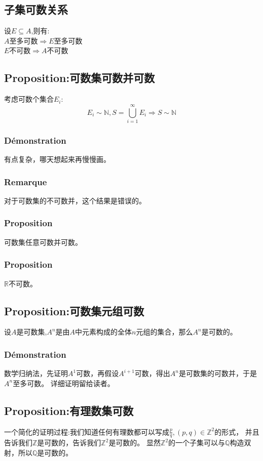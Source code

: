 \documentclass[12pt, a4paper, oneside]{ctexbook}
\begin{document}
  \subsection{子集可数关系}
  \noindent
  设$E\subseteq A$,则有:\\
  $A\text{至多可数}\Rightarrow E\text{至多可数}$\\
  $E\text{不可数}\Rightarrow A\text{不可数}$
  \subsection{Proposition:可数集可数并可数}\label{myref:可数集可数并可数}
  考虑可数个集合$E_i$:
  $$
  E_i\sim\mathbb{N},S=\bigcup_{i=1}^\infty E_i\Rightarrow S\sim\mathbb{N}
  $$
  \subsubsection{Démonstration}
  有点复杂，哪天想起来再慢慢画。
  \subsubsection{Remarque}
  对于可数集的不可数并，这个结果是错误的。
  \subsubsection{Proposition}
  可数集任意可数并可数。
  \subsubsection{Proposition}
  $\mathbb{R}$不可数。
  \subsection{Proposition:可数集元组可数}\label{myref:Rn可数}
  设$A$是可数集,$A^n$是由$A$中元素构成的全体$n$元组的集合，那么$A^n$是可数的。
  \subsubsection{Démonstration}
  数学归纳法，先证明$A^1$可数，再假设$A^{i+1}$可数，得出$A^n$是可数集的可数并，于是$A^n$至多可数。
  详细证明留给读者。
  \subsection{Proposition:有理数集可数}
  一个简化的证明过程:我们知道任何有理数都可以写成$\frac{p}{q},(p,q)\in\mathbb{Z}^2$的形式，
  并且告诉我们$\mathbb{Z}$是可数的，告诉我们$\mathbb{Z}^2$是可数的。
  显然$\mathbb{Z}^2$的一个子集可以与$\mathbb{Q}$构造双射，所以$\mathbb{Q}$是可数的。
\end{document}
